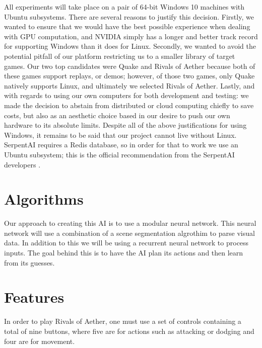 All experiments will take place on a pair of 64-bit Windows 10 machines with Ubuntu subsystems. There are several reasons to justify this decision. Firstly, we wanted to ensure that we would have the best possible experience when dealing with GPU computation, and NVIDIA simply has a longer and better track record for supporting Windows than it does for Linux. Secondly, we wanted to avoid the potential pitfall of our platform restricting us to a smaller library of target games. Our two top candidates were Quake and Rivals of Aether because both of these games support replays, or demos; however, of those two games, only Quake natively supports Linux, and ultimately we selected Rivals of Aether. Lastly, and with regards to using our own computers for both development and testing: we made the decision to abstain from distributed or cloud computing chiefly to save costs, but also as an aesthetic choice based in our desire to push our own hardware to its absolute limits. Despite all of the above justifications for using Windows, it remains to be said that our project cannot live without Linux. SerpentAI requires a Redis database, so in order for that to work we use an Ubuntu subsystem; this is the official recommendation from the SerpentAI developers \cite{SerpentAI}.




\section{Algorithms}

Our approach to creating this AI is to use a modular neural network. This neural network will use a combination of a scene segmentation algrothim to parse visual data. In addition to this we will be using a recurrent neural network to process inputs. The goal behind this is to have the AI plan its actions and then learn from its guesses. 




\section{Features}

In order to play Rivals of Aether, one must use a set of controls containing a total of nine buttons, where five are for actions such as attacking or dodging and four are for movement.

